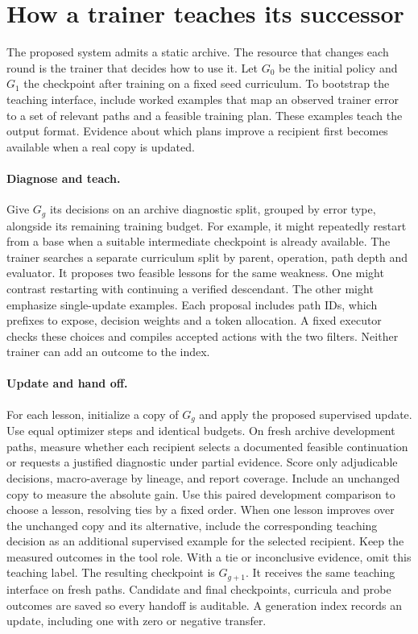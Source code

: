 \documentclass{article}
\begin{document}
\section{How a trainer teaches its successor}
\label{sec:recursion}

The proposed system admits a static archive. The resource that changes each round is the trainer that decides how to use it. Let \(G_0\) be the initial policy and \(G_1\) the checkpoint after training on a fixed seed curriculum. To bootstrap the teaching interface, include worked examples that map an observed trainer error to a set of relevant paths and a feasible training plan. These examples teach the output format. Evidence about which plans improve a recipient first becomes available when a real copy is updated.

\paragraph{Diagnose and teach.}
Give \(G_g\) its decisions on an archive diagnostic split, grouped by error type, alongside its remaining training budget. For example, it might repeatedly restart from a base when a suitable intermediate checkpoint is already available. The trainer searches a separate curriculum split by parent, operation, path depth and evaluator. It proposes two feasible lessons for the same weakness. One might contrast restarting with continuing a verified descendant. The other might emphasize single-update examples. Each proposal includes path IDs, which prefixes to expose, decision weights and a token allocation. A fixed executor checks these choices and compiles accepted actions with the two filters. Neither trainer can add an outcome to the index.

\paragraph{Update and hand off.}
For each lesson, initialize a copy of \(G_g\) and apply the proposed supervised update. Use equal optimizer steps and identical budgets. On fresh archive development paths, measure whether each recipient selects a documented feasible continuation or requests a justified diagnostic under partial evidence. Score only adjudicable decisions, macro-average by lineage, and report coverage. Include an unchanged copy to measure the absolute gain. Use this paired development comparison to choose a lesson, resolving ties by a fixed order. When one lesson improves over the unchanged copy and its alternative, include the corresponding teaching decision as an additional supervised example for the selected recipient. Keep the measured outcomes in the tool role. With a tie or inconclusive evidence, omit this teaching label. The resulting checkpoint is \(G_{g+1}\). It receives the same teaching interface on fresh paths. Candidate and final checkpoints, curricula and probe outcomes are saved so every handoff is auditable. A generation index records an update, including one with zero or negative transfer.
\end{document}
